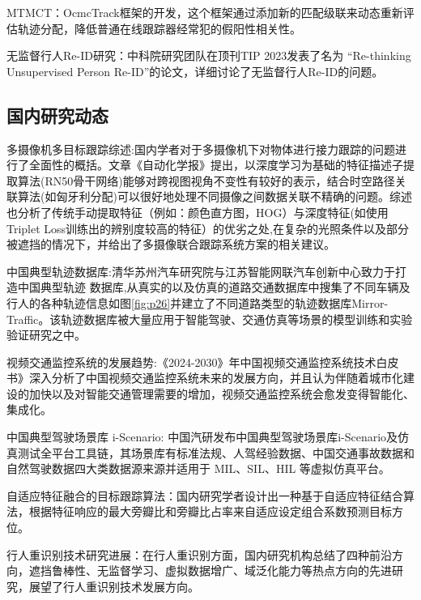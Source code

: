 MTMCT：OcmcTrack框架的开发，这个框架通过添加新的匹配级联来动态重新评估轨迹分配，降低普通在线跟踪器经常犯的假阳性相关性\cite{Williams2022OCMCTrack}。


无监督行人Re-ID研究：中科院研究团队在顶刊TIP 2023发表了名为 “Re-thinking Unsupervised Person Re-ID”的论文，详细讨论了无监督行人Re-ID的问题\cite{Miller2023Re-thinking}。



\subsection{国内研究动态}


多摄像机多目标跟踪综述:国内学者对于多摄像机下对物体进行接力跟踪的问题进行了全面性的概括。文章《自动化学报》提出\cite{wang2023research}，以深度学习为基础的特征描述子提取算法(RN50骨干网络)能够对跨视图视角不变性有较好的表示，结合时空路径关联算法(如匈牙利分配)可以很好地处理不同摄像之间数据关联不精确的问题。综述也分析了传统手动提取特征（例如：颜色直方图，HOG）与深度特征(如使用Triplet Loss训练出的辨别度较高的特征）的优劣之处,在复杂的光照条件以及部分被遮挡的情况下，并给出了多摄像联合跟踪系统方案的相关建议。


中国典型轨迹数据库:清华苏州汽车研究院与江苏智能网联汽车创新中心致力于打造中国典型轨迹 数据库,从真实的以及仿真的道路交通数据库中搜集了不同车辆及行人的各种轨迹信息如图\ref{fig:p26}并建立了不同道路类型的轨迹数据库Mirror-Traffic\cite{tsinghua2021mirrortraffic}。该轨迹数据库被大量应用于智能驾驶、交通仿真等场景的模型训练和实验验证研究之中。

视频交通监控系统的发展趋势:《2024-2030》年中国视频交通监控系统技术白皮书》\cite{cetc2024whitepaper}深入分析了中国视频交通监控系统未来的发展方向，并且认为伴随着城市化建设的加快以及对智能交通管理需要的增加，视频交通监控系统会愈发变得智能化、集成化。

中国典型驾驶场景库 i-Scenario: 中国汽研发布中国典型驾驶场景库i-Scenario及仿真测试全平台工具链，其场景库有标准法规、人驾经验数据、中国交通事故数据和自然驾驶数据四大类数据源来源并适用于 MIL、SIL、HIL 等虚拟仿真平台。

自适应特征融合的目标跟踪算法：国内研究学者设计出一种基于自适应特征结合算法，根据特征响应的最大旁瓣比和旁瓣比占率来自适应设定组合系数预测目标方位\cite{chen2023adaptive}。


行人重识别技术研究进展：在行人重识别方面，国内研究机构总结了四种前沿方向\cite{li2023progress}，遮挡鲁棒性、无监督学习、虚拟数据增广、域泛化能力等热点方向的先进研究，展望了行人重识别技术发展方向。






